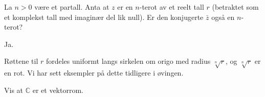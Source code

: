 \begin{oppgave}
La $n>0$ være et partall. Anta at $z$ er en $n$-terot av et reelt tall $r$ (betraktet som et komplekst tall med imaginær del lik null). Er den konjugerte $\bar{z}$ også en $n$-terot?
\end{oppgave}

\begin{losning}
Ja.

\noindent
Røttene til $r$ fordeles uniformt langs sirkelen om origo med radius $\sqrt[n]{r}$, og $\sqrt[n]{r}$ er en rot. Vi har sett eksempler på dette tidligere i øvingen.
\end{losning}

\begin{oppgave}
Vis at $\mathbb C$ er et vektorrom.
\end{oppgave}

